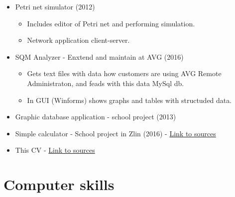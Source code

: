 \documentclass[11pt,a4paper,sans]{moderncv}        %
\newcommand{\Csh}{C{\lserif{\#}}}
\begin{document}
{
\begin{itemize}
	\item Petri net simulator (2012)	
	\begin{itemize}
		\item Includes editor of Petri net and performing simulation.
		\item Network application client-server.
	\end{itemize}
\end{itemize}
}

\cvitemwithcomment{\Csh{}}{}
{
\begin{itemize}
	\item SQM Analyzer - Enxtend and maintain at AVG (2016)
	\begin{itemize}
		\item Gets text files with data how customers are using AVG Remote Administraton, and feads with this data MySql db. 	
		\item In GUI (Winforms) shows graphs and tables with structuded data.
	\end{itemize}
	\item Graphic database application - school project (2013)	
\end{itemize}
}

{
\begin{itemize}
	\item Simple calculator - School project in Zlin (2016) - \href{https://github.com/navrkald/Zlin_wxWidgets_python_simple_calculator}{Link to sources} 
\end{itemize}
}

\cvitemwithcomment{\LaTeX}{}
{
\begin{itemize}
	\item This CV - \href{https://github.com/navrkald/CV_david_navrkal}{Link to sources} 
\end{itemize}
}

\section{Computer skills}

\end{document}
